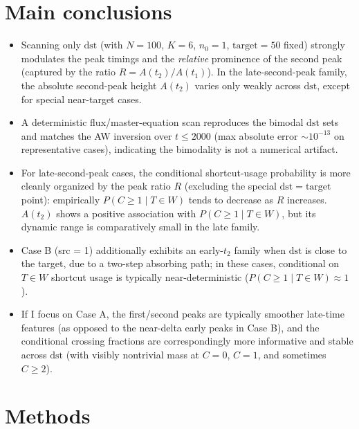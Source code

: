 \documentclass[11pt]{article}
\begin{document}
\section{Main conclusions}
\begin{itemize}
  \item Scanning only $\mathrm{dst}$ (with $N=100$, $K=6$, $n_0=1$, $\mathrm{target}=50$ fixed) strongly modulates the peak timings and the \emph{relative} prominence of the second peak (captured by the ratio $R=A(t_2)/A(t_1)$). In the late-second-peak family, the absolute second-peak height $A(t_2)$ varies only weakly across $\mathrm{dst}$, except for special near-target cases.
  \item A deterministic flux/master-equation scan reproduces the bimodal $\mathrm{dst}$ sets and matches the AW inversion over $t\le 2000$ (max absolute error $\sim 10^{-13}$ on representative cases), indicating the bimodality is not a numerical artifact.
  \item For late-second-peak cases, the conditional shortcut-usage probability is more cleanly organized by the peak ratio $R$ (excluding the special $\mathrm{dst}=\mathrm{target}$ point): empirically $P(C\ge1\mid T\in W)$ tends to decrease as $R$ increases. $A(t_2)$ shows a positive association with $P(C\ge1\mid T\in W)$, but its dynamic range is comparatively small in the late family.
  \item Case B (src = 1) additionally exhibits an early-$t_2$ family when $\mathrm{dst}$ is close to the target, due to a two-step absorbing path; in these cases, conditional on $T\in W$ shortcut usage is typically near-deterministic ($P(C\ge1\mid T\in W)\approx 1$).
  \item If I focus on Case A, the first/second peaks are typically smoother late-time features (as opposed to the near-delta early peaks in Case B), and the conditional crossing fractions are correspondingly more informative and stable across $\mathrm{dst}$ (with visibly nontrivial mass at $C=0$, $C=1$, and sometimes $C\ge2$).
\end{itemize}

\section{Methods}
\end{document}
